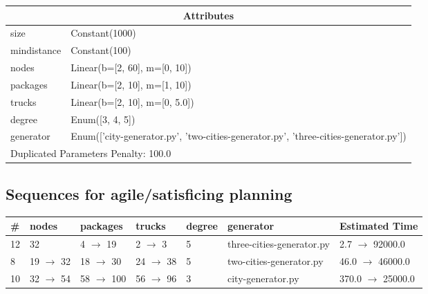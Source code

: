 \documentclass{article}
\begin{document}
                    \begin{center}
                    \begin{tabular}{@{}p{}p{}@{}}
                    \multicolumn{2}{c}{\bf \large Attributes}\\\midrule
                    size & Constant(1000)\\
mindistance & Constant(100)\\
nodes & Linear(b=[2, 60], m=[0, 10])\\
packages & Linear(b=[2, 10], m=[1, 10])\\
trucks & Linear(b=[2, 10], m=[0, 5.0])\\
degree & Enum([3, 4, 5])\\
generator & Enum(['city-generator.py', 'two-cities-generator.py', 'three-cities-generator.py'])
                    
                     \\\midrule
                    \multicolumn{2}{l}{Duplicated Parameters Penalty: 100.0}
                    \end{tabular}
                    \end{center}
                
                         \subsection*{Sequences for agile/satisficing planning}

                        \begin{center}
                        \begin{tabular}{@{}l|l|l|l|l|l|l@{}}
                        \# & nodes & packages & trucks & degree & generator & Estimated Time\\\midrule
                        12&32&4 $\rightarrow$ 19&2 $\rightarrow$ 3&5&three-cities-generator.py&2.7 $\rightarrow$ 92000.0\\
8&19 $\rightarrow$ 32&18 $\rightarrow$ 30&24 $\rightarrow$ 38&5&two-cities-generator.py&46.0 $\rightarrow$ 46000.0\\
10&32 $\rightarrow$ 54&58 $\rightarrow$ 100&56 $\rightarrow$ 96&3&city-generator.py&370.0 $\rightarrow$ 25000.0
                        \end{tabular}
                        \end{center}
                    
\end{document}
